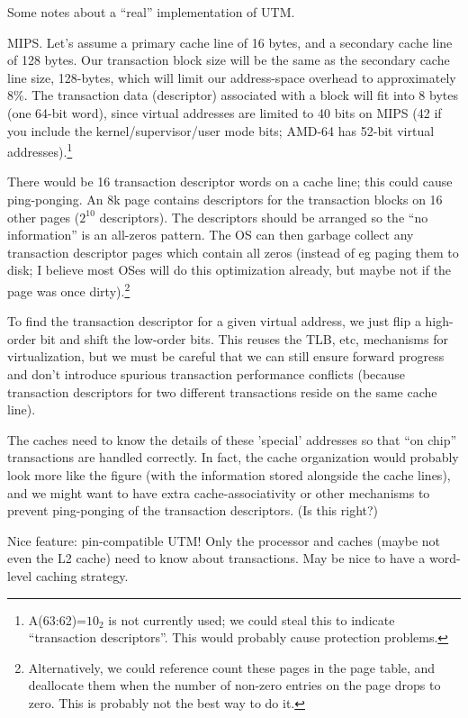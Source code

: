 Some notes about a ``real'' implementation of UTM.

MIPS.  Let's assume a primary cache line of 16 bytes, and a secondary
cache line of 128 bytes.  Our transaction block size will be the same
as the secondary cache line size, 128-bytes, which will limit our
address-space overhead to approximately 8\%.  The transaction data (descriptor)
associated with a block will fit into 8 bytes (one 64-bit word), since
virtual addresses are limited to 40 bits on MIPS (42 if you include
the kernel/supervisor/user mode bits; AMD-64 has 52-bit virtual
addresses).\footnote{A(63:62)=$10_2$ is not currently used; we could
steal this to indicate ``transaction descriptors''.  This would probably
cause protection problems.}

There would be 16 transaction descriptor words on a cache line; this
could cause ping-ponging.  An 8k page contains descriptors for the
transaction blocks on 16 other pages ($2^10$ descriptors).  The
descriptors should be arranged so the ``no information'' is an
all-zeros pattern.  The OS can then garbage collect any transaction
descriptor pages which contain all zeros (instead of eg paging them to
disk; I believe most OSes will do this optimization already, but maybe
not if the page was once dirty).\footnote{Alternatively, we could reference
count these pages in the page table, and deallocate them when the
number of non-zero entries on the page drops to zero.  This is
probably not the best way to do it.}

To find the transaction descriptor for a given virtual address, we
just flip a high-order bit and shift the low-order bits.  This reuses
the TLB, etc, mechanisms for virtualization, but we must be careful
that we can still ensure forward progress and don't introduce spurious
transaction performance conflicts (because transaction descriptors for
two different transactions reside on the same cache line).

The caches need to know the details of these 'special' addresses so
that ``on chip'' transactions are handled correctly.  In fact, the
cache organization would probably look more like the figure (with the
information stored alongside the cache lines), and we might want to
have extra cache-associativity or other mechanisms to prevent
ping-ponging of the transaction descriptors. (Is this right?)

Nice feature: pin-compatible UTM!  Only the processor and caches
(maybe not even the L2 cache) need to know about transactions.
May be nice to have a word-level caching strategy.

